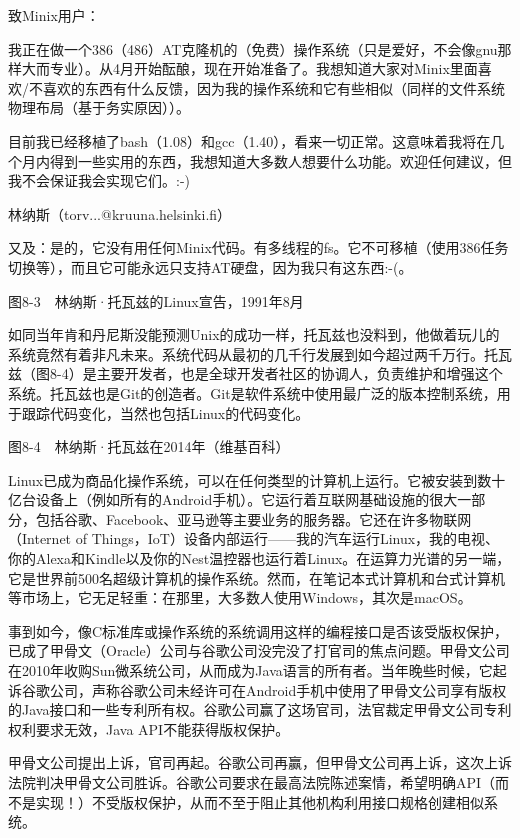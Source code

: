 \documentclass[a4paper,12pt,UTF8,twoside]{ctexbook}
\begin{document}
{{致Minix用户：

我正在做一个386（486）AT克隆机的（免费）操作系统（只是爱好，不会像gnu那样大而专业）。从4月开始酝酿，现在开始准备了。我想知道大家对Minix里面喜欢/不喜欢的东西有什么反馈，因为我的操作系统和它有些相似（同样的文件系统物理布局（基于务实原因））。

目前我已经移植了bash（1.08）和gcc（1.40），看来一切正常。这意味着我将在几个月内得到一些实用的东西，我想知道大多数人想要什么功能。欢迎任何建议，但我不会保证我会实现它们。:-)

林纳斯（torv...@kruuna.helsinki.fi）

又及：是的，它没有用任何Minix代码。有多线程的fs。它不可移植（使用386任务切换等），而且它可能永远只支持AT硬盘，因为我只有这东西:-(。



图8-3　林纳斯·托瓦兹的Linux宣告，1991年8月

如同当年肯和丹尼斯没能预测Unix的成功一样，托瓦兹也没料到，他做着玩儿的系统竟然有着非凡未来。系统代码从最初的几千行发展到如今超过两千万行。托瓦兹（图8-4）是主要开发者，也是全球开发者社区的协调人，负责维护和增强这个系统。托瓦兹也是Git的创造者。Git是软件系统中使用最广泛的版本控制系统，用于跟踪代码变化，当然也包括Linux的代码变化。



图8-4　林纳斯·托瓦兹在2014年（维基百科）

Linux已成为商品化操作系统，可以在任何类型的计算机上运行。它被安装到数十亿台设备上（例如所有的Android手机）。它运行着互联网基础设施的很大一部分，包括谷歌、Facebook、亚马逊等主要业务的服务器。它还在许多物联网（Internet of Things，IoT）设备内部运行——我的汽车运行Linux，我的电视、你的Alexa和Kindle以及你的Nest温控器也运行着Linux。在运算力光谱的另一端，它是世界前500名超级计算机的操作系统。然而，在笔记本式计算机和台式计算机等市场上，它无足轻重：在那里，大多数人使用Windows，其次是macOS。

事到如今，像C标准库或操作系统的系统调用这样的编程接口是否该受版权保护，已成了甲骨文（Oracle）公司与谷歌公司没完没了打官司的焦点问题。甲骨文公司在2010年收购Sun微系统公司，从而成为Java语言的所有者。当年晚些时候，它起诉谷歌公司，声称谷歌公司未经许可在Android手机中使用了甲骨文公司享有版权的Java接口和一些专利所有权。谷歌公司赢了这场官司，法官裁定甲骨文公司专利权利要求无效，Java API不能获得版权保护。

甲骨文公司提出上诉，官司再起。谷歌公司再赢，但甲骨文公司再上诉，这次上诉法院判决甲骨文公司胜诉。谷歌公司要求在最高法院陈述案情，希望明确API（而不是实现！）不受版权保护，从而不至于阻止其他机构利用接口规格创建相似系统。

}}
\end{document}
